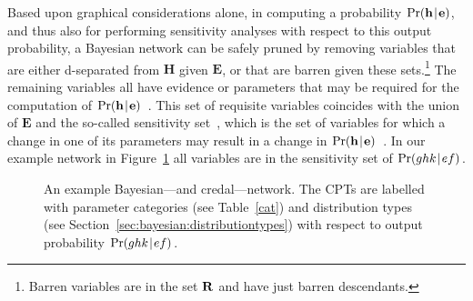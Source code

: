 \documentclass[10pt,a4paper]{paper}
\theoremstyle{definition}
\newcommand{\hyp}{\mathbf{h}}
\newcommand{\ev}{\mathbf{e}}
\newcommand{\hyps}{\mathbf{H}}
\newcommand{\evs}{\mathbf{E}}
\newcommand{\newmid}{\hspace{0.9pt}\vert\hspace{0.9pt}}
\begin{document}
Based upon graphical considerations alone, in computing a probability $\Pr(\hyp\newmid\ev)$, and thus also for performing sensitivity analyses with respect to this output probability, a Bayesian network can be safely pruned by removing variables that are either d-separated from $\hyps$ given $\evs$, or that are barren given these sets.\footnote{Barren variables are in the set $\bf{R}$ and have just barren descendants.}
The remaining variables all have evidence or parameters that may be required for the computation of $\Pr(\hyp\newmid\ev)$~\cite{shachter98a}. This set of requisite variables coincides with the union of $\evs$ and the so-called sensitivity set~\cite{Meekes2015}, which is the set of variables for which a change in one of its parameters may result in a change in $\Pr(\hyp\newmid\ev)$~\cite{Coupe2002}. In our example network in Figure~\ref{fig-vbMAP-TC} all variables are in the sensitivity set of $\Pr(ghk\newmid ef)$.


\begin{figure}[t]
\begin{center}
\vspace{12pt}
\caption{An example Bayesian---and credal---network. The CPTs are labelled with parameter categories (see Table~\ref{cat}) and distribution types (see Section~\ref{sec:bayesian:distributiontypes}) with respect to output probability $\Pr(ghk\newmid ef)$.}
\label{fig-vbMAP-TC}
\end{center}
\end{figure}
\end{document}
